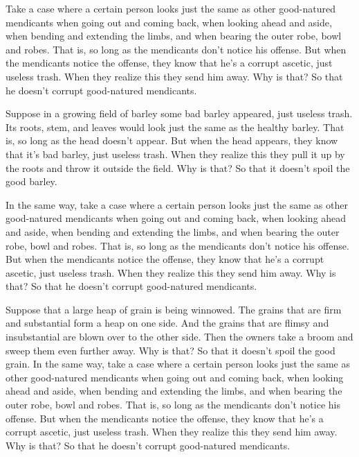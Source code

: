 \documentclass[12pt,openany]{book}%
\begin{document}
Take a case where a certain person looks just the same as other good-natured mendicants when going out and coming back, when looking ahead and aside, when bending and extending the limbs, and when bearing the outer robe, bowl and robes. That is, so long as the mendicants don’t notice his offense. But when the mendicants notice the offense, they know that he’s a corrupt ascetic, just useless trash. When they realize this they send him away. Why is that? So that he doesn’t corrupt good-natured mendicants. 

Suppose in a growing field of barley some bad barley appeared, just useless trash. Its roots, stem, and leaves would look just the same as the healthy barley. That is, so long as the head doesn’t appear. But when the head appears, they know that it’s bad barley, just useless trash. When they realize this they pull it up by the roots and throw it outside the field. Why is that? So that it doesn’t spoil the good barley. 

In the same way, take a case where a certain person looks just the same as other good-natured mendicants when going out and coming back, when looking ahead and aside, when bending and extending the limbs, and when bearing the outer robe, bowl and robes. That is, so long as the mendicants don’t notice his offense. But when the mendicants notice the offense, they know that he’s a corrupt ascetic, just useless trash. When they realize this they send him away. Why is that? So that he doesn’t corrupt good-natured mendicants. 

Suppose that a large heap of grain is being winnowed. The grains that are firm and substantial form a heap on one side. And the grains that are flimsy and insubstantial are blown over to the other side. Then the owners take a broom and sweep them even further away. Why is that? So that it doesn’t spoil the good grain. In the same way, take a case where a certain person looks just the same as other good-natured mendicants when going out and coming back, when looking ahead and aside, when bending and extending the limbs, and when bearing the outer robe, bowl and robes. That is, so long as the mendicants don’t notice his offense. But when the mendicants notice the offense, they know that he’s a corrupt ascetic, just useless trash. When they realize this they send him away. Why is that? So that he doesn’t corrupt good-natured mendicants. 
\end{document}

